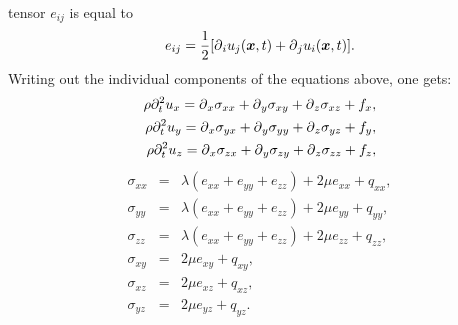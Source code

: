 \documentclass[11pt]{article}
\begin{document}
tensor $e_{ij}$
is equal to
%
\begin{eqnarray}
    e_{ij} = \frac{1}{2}[\mbox{$\partial$}_i u_j(\mbox{\boldmath $x$}, t) + \mbox{$\partial$}_j u_i(\mbox{\boldmath $x$},t)].
					  \label{eq:iso-strain}
\end{eqnarray}
%
Writing out the individual components of the equations above, one gets:
%
\begin{eqnarray*}
  \rho \partial^2_t{u}_x = \mbox{$\partial$}_x \sigma_{xx} +\mbox{$\partial$}_y \sigma_{xy} +\mbox{$\partial$}_z \sigma_{xz} 
                                                      + f_x, \\
  \rho \partial^2_t{u}_y = \mbox{$\partial$}_x \sigma_{yx} +\mbox{$\partial$}_y \sigma_{yy} +\mbox{$\partial$}_z \sigma_{yz} 
                                                      + f_y, \\
  \rho \partial^2_t{u}_z = \mbox{$\partial$}_x \sigma_{zx} +\mbox{$\partial$}_y \sigma_{zy} +\mbox{$\partial$}_z \sigma_{zz} 
                                                      + f_z,
\end{eqnarray*}
%
\begin{eqnarray*}
  \sigma_{xx} & = & \lambda \left (e_{xx} + e_{yy} + e_{zz}\right)+ 2\mu e_{xx} 
                                                   +q_{xx}, \\
  \sigma_{yy} & = & \lambda \left (e_{xx} + e_{yy} + e_{zz}\right)+ 2\mu e_{yy} 
                                                   +q_{yy}, \\
  \sigma_{zz} & = & \lambda \left (e_{xx} + e_{yy} + e_{zz}\right)+ 2\mu e_{zz} 
                                                   +q_{zz}, \\
  \sigma_{xy} & = & 2\mu e_{xy} +q_{xy}, \\
  \sigma_{xz} & = & 2\mu e_{xz} +q_{xz}, \\
  \sigma_{yz} & = & 2\mu e_{yz} +q_{yz}.
\end{eqnarray*}
%
\end{document}
